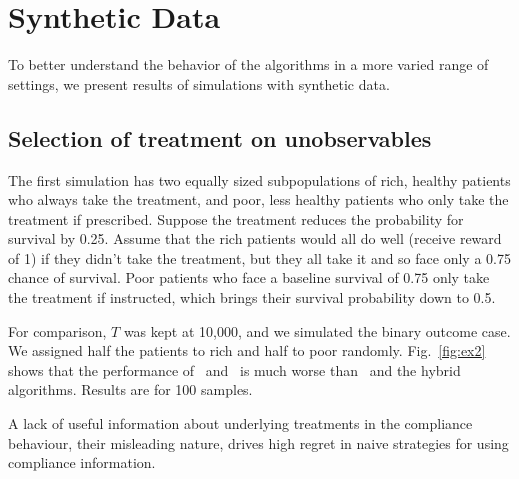 \section{Synthetic Data}


To better understand the behavior of the algorithms in a more varied range of settings, we present results of simulations with synthetic data.



\subsection{Selection of treatment on unobservables}
The first simulation has two equally sized subpopulations of rich, healthy patients who always take the treatment, and poor, less healthy patients who only take the treatment if prescribed. Suppose the treatment reduces the probability for survival by 0.25. Assume that the rich patients would all do well (receive reward of 1) if they didn't take the treatment, but they all take it and so face only a 0.75 chance of survival. Poor patients who face a baseline survival of 0.75 only take the treatment if instructed, which brings their survival probability down to 0.5.

For comparison, $T$ was kept at 10,000, and we simulated the binary outcome case. We assigned half the patients to rich and half to poor randomly. Fig.~\eqref{fig:ex2} shows that the performance of \actual\, and \comply\, is much worse than \chosen\, and the hybrid algorithms. Results are for 100 samples.
%

 A lack of useful information about underlying treatments in the compliance behaviour, their misleading nature, drives high regret in naive strategies for using compliance information. 
%


